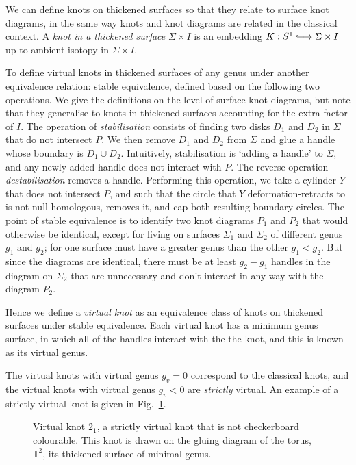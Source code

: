 \documentclass[12pt]{report}
\newcommand{\T}{\mathbb{T}}
\begin{document}
We can define knots on thickened surfaces so that they relate to surface knot diagrams, in the same way knots and knot diagrams are related in the classical context. A \textit{knot in a thickened surface} $\Sigma \times I$ is an embedding $K:S^{1} \lhook\joinrel\longrightarrow \Sigma \times I$ up to ambient isotopy in $\Sigma \times I$.

To define virtual knots in thickened surfaces of any genus under another equivalence relation: stable equivalence, defined based on the following two operations. We give the definitions on the level of surface knot diagrams, but note that they generalise to knots in thickened surfaces accounting for the extra factor of $I$. The operation of \textit{stabilisation} consists of finding two disks $D_{1}$ and $D_{2}$ in $\Sigma$ that do not intersect $P$. We then remove $D_{1}$ and $D_{2}$ from $\Sigma$ and glue a handle whose boundary is $D_{1} \cup D_{2}$. Intuitively, stabilisation is `adding a handle' to $\Sigma$, and any newly added handle does not interact with $P$. The reverse operation \textit{destabilisation} removes a handle. Performing this operation, we take a cylinder $Y$ that does not intersect $P$, and such that the circle that $Y$ deformation-retracts to is not null-homologous, removes it, and cap both resulting boundary circles. The point of stable equivalence is to identify two knot diagrams $P_{1}$ and $P_{2}$ that would otherwise be identical, except for living on surfaces $\Sigma_{1}$ and $\Sigma_{2}$ of different genus $g_{1}$ and $g_{2}$; for one surface must have a greater genus than the other $g_{1} < g_{2}$. But since the diagrams are identical, there must be at least $g_{2} - g_{1}$ handles in the diagram on $\Sigma_{2}$ that are unnecessary and don't interact in any way with the diagram $P_{2}$.

Hence we define a \textit{virtual knot} as an equivalence class of knots on thickened surfaces under stable equivalence. Each virtual knot has a minimum genus surface, in which all of the handles interact with the the knot, and this is known as its virtual genus.

The virtual knots with virtual genus $g_{v} = 0$ correspond to the classical knots, and the virtual knots with virtual genus $g_{v} < 0$ are \textit{strictly} virtual. An example of a strictly virtual knot is given in Fig.~\ref{fig:not-checkerboard-colourable}.

\begin{figure}[hbt]
	\centering
	\def\svgscale{0.35}
	
	\caption{Virtual knot $2_{1}$, a strictly virtual knot that is not checkerboard colourable. This knot is drawn on the gluing diagram of the torus, $\T^{2}$, its thickened surface of minimal genus.}
	\label{fig:not-checkerboard-colourable}
\end{figure}
\end{document}
